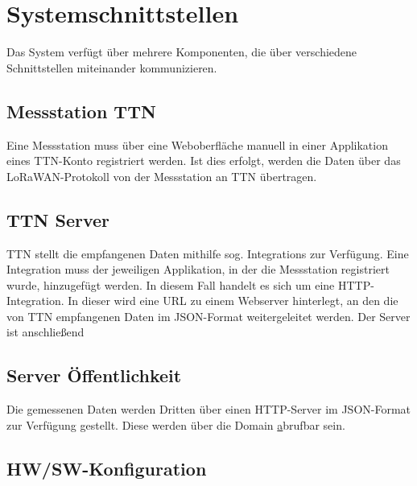 \section{Systemschnittstellen}

Das System verf\"ugt \"uber mehrere Komponenten, die \"uber verschiedene
Schnittstellen miteinander kommunizieren.

\subsection{Messstation \rightarrow TTN}
Eine Messstation muss \"uber eine Weboberfl\"ache manuell in einer Applikation
eines TTN-Konto registriert werden. Ist dies erfolgt, werden die Daten \"uber
das LoRaWAN-Protokoll von der Messstation an TTN \"ubertragen.

\subsection{TTN \rightarrow Server}
TTN stellt die empfangenen Daten mithilfe sog. \glqq Integrations\grqq{} zur Verf\"ugung.
Eine \glqq Integration\grqq{} muss der jeweiligen Applikation, in der die Messstation registriert
wurde, hinzugef\"ugt werden.
In diesem Fall handelt es sich um eine \glqq HTTP-Integration\grqq. In dieser wird eine URL zu
einem Webserver hinterlegt, an den die von TTN empfangenen Daten im JSON-Format
weitergeleitet werden. Der Server ist anschlie{\ss}end

\subsection{Server \rightarrow \"Offentlichkeit}
Die gemessenen Daten werden Dritten \"uber einen HTTP-Server im JSON-Format zur Verf\"ugung gestellt.
Diese werden \"uber die Domain \href{http://www.berlinerdaten.de/} abrufbar sein.


\subsection{HW/SW-Konfiguration}


